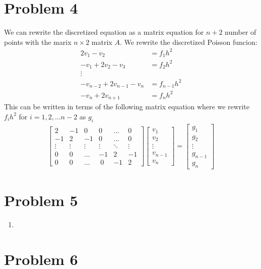 \documentclass[english,notitlepage]{revtex4-1}  %
\begin{document}
\section*{Problem 4}
We can rewrite the discretized equation as a matrix equation for $n+2$ number of points with the marix $n\times 2$ matrix $A$. We rewrite the discretized Poisson funcion:
\begin{align*}
  2 v_1- v_2 &= f_1 h^2\\
  -v_{1} +2 v_2 - v_{3} &= f_2 h^2 \\
    \vdots \\
  -v_{n-2} + 2 v_{n-1} - v_{n} &= f_{n-1} h^2\\
  - v_{n} + 2 v_{n+1}  &= f_{n} h^2
\end{align*}
This can be written in terms of the following matrix equation where we rewrite $f_i h^2$ for $i = 1,2,\dots n-2$ as $g_i$
\begin{align*}
  \begin{bmatrix}
    2 & -1 & 0 & 0 & \dots &0 \\
    -1 & 2 & -1 & 0 &\dots& 0 \\
    \vdots & \vdots & \vdots & \vdots & \ddots & \vdots\\
    0 & 0 & \dots & -1 & 2 & -1 \\
    0 & 0 & \dots & \ 0 &-1 & 2
  \end{bmatrix}
  \begin{bmatrix}
    v_1 \\
    v_2 \\
    \vdots\\
    v_{n-1}\\
    v_{n}
  \end{bmatrix}
  =
  \begin{bmatrix}
    g_1 \\
    g_2 \\
    \vdots\\
    g_{n-1}\\
    g_{n}
  \end{bmatrix}
\end{align*}
\section*{Problem 5}

\begin{enumerate}[label= \alph*)]
  \item 
\end{enumerate}

\section*{Problem 6}
\end{document}
